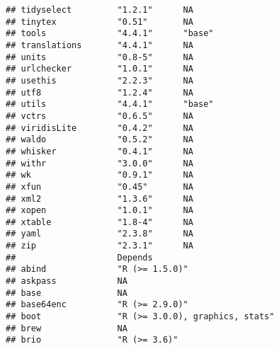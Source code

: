 \documentclass[
]{article}
\begin{document}
\begin{verbatim}
## tidyselect         "1.2.1"      NA           
## tinytex            "0.51"       NA           
## tools              "4.4.1"      "base"       
## translations       "4.4.1"      NA           
## units              "0.8-5"      NA           
## urlchecker         "1.0.1"      NA           
## usethis            "2.2.3"      NA           
## utf8               "1.2.4"      NA           
## utils              "4.4.1"      "base"       
## vctrs              "0.6.5"      NA           
## viridisLite        "0.4.2"      NA           
## waldo              "0.5.2"      NA           
## whisker            "0.4.1"      NA           
## withr              "3.0.0"      NA           
## wk                 "0.9.1"      NA           
## xfun               "0.45"       NA           
## xml2               "1.3.6"      NA           
## xopen              "1.0.1"      NA           
## xtable             "1.8-4"      NA           
## yaml               "2.3.8"      NA           
## zip                "2.3.1"      NA           
##                    Depends                                                                                                                                                                                               
## abind              "R (>= 1.5.0)"                                                                                                                                                                                        
## askpass            NA                                                                                                                                                                                                    
## base               NA                                                                                                                                                                                                    
## base64enc          "R (>= 2.9.0)"                                                                                                                                                                                        
## boot               "R (>= 3.0.0), graphics, stats"                                                                                                                                                                       
## brew               NA                                                                                                                                                                                                    
## brio               "R (>= 3.6)"                                                                                                                                                                                          

\end{verbatim}
\end{document}
